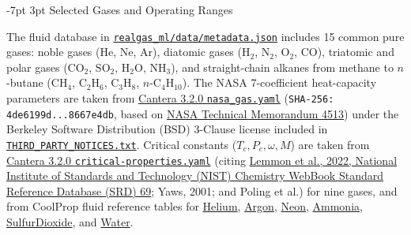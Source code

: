\documentclass[10pt,a4paper]{article}
\makeatletter
\renewcommand\section{\@startsection {section}{1}{\z@}%
  {-7pt \@plus -2pt \@minus -1pt}%
  {3pt \@plus 1pt}%
  {\normalfont\large\bfseries\color{darkslate}}}
\makeatother
\begin{document}
\section{Selected Gases and Operating Ranges}

The fluid database in \href{https://github.com/satwikgupta122/realgas_ml/blob/main/realgas_ml/data/metadata.json}{\texttt{realgas\_ml/data/metadata.json}} includes 15 common pure gases: noble gases ($\mathrm{He}$, $\mathrm{Ne}$, $\mathrm{Ar}$), diatomic gases ($\mathrm{H_2}$, $\mathrm{N_2}$, $\mathrm{O_2}$, $\mathrm{CO}$), triatomic and polar gases ($\mathrm{CO_2}$, $\mathrm{SO_2}$, $\mathrm{H_2O}$, $\mathrm{NH_3}$), and straight-chain alkanes from methane to $n$-butane ($\mathrm{CH_4}$, $\mathrm{C_2H_6}$, $\mathrm{C_3H_8}$, $n\text{-}\mathrm{C_4H_{10}}$). The NASA 7-coefficient heat-capacity parameters are taken from \href{https://github.com/Cantera/cantera/blob/v3.2.0/data/nasa_gas.yaml}{Cantera 3.2.0 \texttt{nasa\_gas.yaml}} (\texttt{SHA-256: 4de6199d...8667e4db}, based on \href{https://ntrs.nasa.gov/citations/19940013151}{NASA Technical Memorandum 4513}) under the Berkeley Software Distribution (BSD) 3-Clause license included in \href{https://github.com/satwikgupta122/realgas_ml/blob/main/THIRD_PARTY_NOTICES.txt}{\texttt{THIRD\_PARTY\_NOTICES.txt}}. Critical constants ($T_c, P_c, \omega, M$) are taken from \href{https://github.com/Cantera/cantera/blob/v3.2.0/data/critical-properties.yaml}{Cantera 3.2.0 \texttt{critical-properties.yaml}} (citing \href{https://doi.org/10.18434/T4D303}{Lemmon et al., 2022, National Institute of Standards and Technology (NIST) Chemistry WebBook Standard Reference Database (SRD) 69}; Yaws, 2001; and Poling et al.) for nine gases, and from CoolProp fluid reference tables for \href{https://coolprop.org/fluid_properties/fluids/Helium.html}{Helium}, \href{https://coolprop.org/fluid_properties/fluids/Argon.html}{Argon}, \href{https://coolprop.org/fluid_properties/fluids/Neon.html}{Neon}, \href{https://coolprop.org/fluid_properties/fluids/Ammonia.html}{Ammonia}, \href{https://coolprop.org/fluid_properties/fluids/SulfurDioxide.html}{SulfurDioxide}, and \href{https://coolprop.org/fluid_properties/fluids/Water.html}{Water}.
\end{document}
